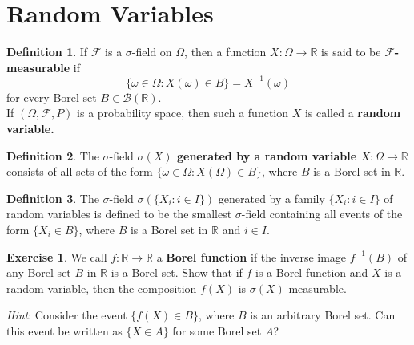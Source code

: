 \documentclass[
]{book}
\theoremstyle{definition}
\newtheorem{definition}{Definition}[chapter]
\theoremstyle{definition}
\theoremstyle{definition}
\newtheorem{exercise}{Exercise}[chapter]
\theoremstyle{definition}
\theoremstyle{remark}
\begin{document}
\section{Random Variables}\label{random-variables}

\begin{definition}
\protect\hypertarget{def:unnamed-chunk-14}{}\label{def:unnamed-chunk-14}If \(\mathcal{F}\) is a \(\sigma\)-field on \(\Omega\), then a function \(X : \Omega \to \mathbb{R}\) is said to be \textbf{\(\mathcal{F}\)-measurable} if
\[\{\omega \in \Omega : X(\omega) \in B\}=X^{-1}(\omega)\]
for every Borel set \(B \in \mathcal{B}(\mathbb{R})\).\\
If \((\Omega, \mathcal{F}, P)\) is a probability space, then such a function \(X\) is called a \textbf{random variable.}
\end{definition}

\begin{definition}
\protect\hypertarget{def:unnamed-chunk-15}{}\label{def:unnamed-chunk-15}The \(\sigma\)-field \textbf{\(\sigma(X)\) generated by a random variable \(X : \Omega \to \mathbb{R}\)} consists of all sets
of the form \(\{\omega \in \Omega : X(\Omega)\in B\}\), where \(B\) is a Borel set in \(\mathbb{R}\).
\end{definition}

\begin{definition}
\protect\hypertarget{def:unnamed-chunk-16}{}\label{def:unnamed-chunk-16}The \(\sigma\)-field \(\sigma(\{X_i : i \in I\})\) generated by a family \(\{X_i : i \in I\}\) of random variables
is defined to be the smallest \(\sigma\)-field containing all events of the form \(\{X_i \in B\}\),
where \(B\) is a Borel set in \(\mathbb{R}\) and \(i \in I\).
\end{definition}

\begin{exercise}
\protect\hypertarget{exr:unnamed-chunk-17}{}\label{exr:unnamed-chunk-17}We call \(f : \mathbb{R} \to \mathbb{R}\) a \textbf{Borel function} if the inverse image \(f^{-1}(B)\) of any Borel set \(B\) in \(\mathbb{R}\) is a Borel set. Show that if \(f\) is a Borel function and \(X\) is a random variable, then the composition \(f(X)\) is \(\sigma(X)\)-measurable.

\emph{Hint}: Consider the event \(\{f(X) \in B\}\), where \(B\) is an arbitrary Borel set. Can this
event be written as \(\{X \in A\}\) for some Borel set \(A\)?
\end{exercise}
\end{document}
